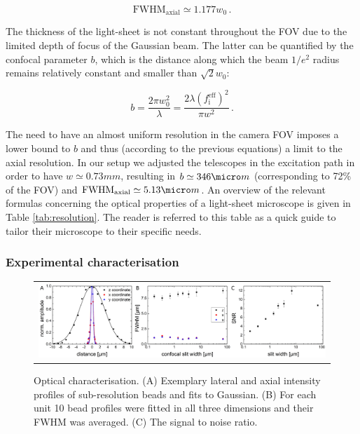\documentclass[12pt]{spieman}  %
\begin{document}
\begin{equation}
\text{FWHM}_{\text{axial}} \simeq 1.177 w_0 \, .
\end{equation}

The thickness of the light-sheet is not constant throughout the FOV due to the limited depth of focus of the Gaussian beam. The latter can be quantified by the confocal parameter $b$, which is the distance along which the beam $1/e^2$ radius remains relatively constant and smaller than $\sqrt{2} w_0$:

\begin{equation}
b = \frac{2\pi w_0^2}{\lambda} = \frac{2 \lambda  {(f_{\text{i}}^{\text{eff}})}^2}{\pi w^2}\, .
\end{equation}

The need to have an almost uniform resolution in the camera FOV imposes a lower bound to $b$ and thus (according to the previous equations) a limit to the axial resolution. In our setup we adjusted the telescopes in the excitation path in order to have $w \simeq 0.73 mm$, resulting in $b \simeq 346 \micro m$ (corresponding to 72\% of the FOV) and $\text{FWHM}_{\text{axial}} \simeq 5.13 \micro m$. An overview of the relevant formulas concerning the optical properties of a light-sheet microscope is given in Table \ref{tab:resolution}. The reader is referred to this table as a quick guide to tailor their microscope to their specific needs.

\subsubsection{Experimental characterisation}

\begin{figure}
   \begin{center}
   \begin{tabular}{c}
   \includegraphics[width=\textwidth]{origin.eps}
   \end{tabular}
   \end{center}
   \caption{\label{fig:origin} Optical characterisation. (A) Exemplary lateral and axial intensity profiles of sub-resolution beads and fits to Gaussian. (B) For each unit 10 bead profiles were fitted in all three dimensions and their FWHM was averaged. (C) The signal to noise ratio.} 
\end{figure}
\end{document}

